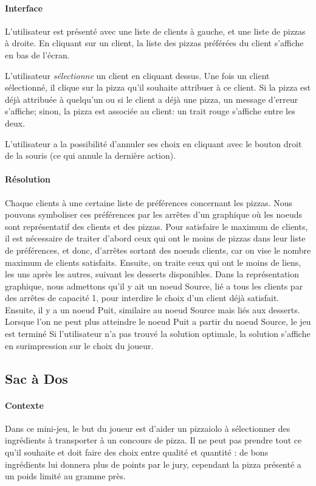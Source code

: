 		\paragraph{Interface}
			L'utilisateur est présenté avec une liste de clients à gauche, et une liste
			 de pizzas à droite. En cliquant sur un client, la liste des pizzas préférées
			 du client s'affiche en bas de l'écran.

			L'utilisateur \emph{sélectionne} un client en cliquant dessus. Une fois un client
			 sélectionné, il clique sur la pizza qu'il souhaite attribuer à ce client. Si la
			 pizza est déjà attribuée à quelqu'un ou si le client a déjà une pizza, un message
			 d'erreur s'affiche; sinon, la pizza est associée au client: un trait rouge
			 s'affiche entre les deux.

			L'utilisateur a la possibilité d'annuler ses choix en cliquant avec le bouton
			 droit de la souris (ce qui annule la dernière action).
		\paragraph{Résolution}
			Chaque clients à une certaine liste de préférences concernant les pizzas.
			Nous pouvons symboliser ces préférences par les arrêtes d'un graphique où
			 les noeuds sont représentatif des clients et des pizzas.
			Pour satisfaire le maximum de clients, il est nécessaire de traiter d'abord
			 ceux qui ont le moins de pizzas dans leur liste de préférences, et donc, 
			 d'arrêtes sortant des noeuds clients, car on vise le nombre maximum de clients
			 satisfaits.
			Ensuite, on traite ceux qui ont le moins de liens, les uns après les autres,
			 suivant les desserts disponibles.
			Dans la représentation graphique, nous admettons qu'il y ait un noeud Source,
			 lié a tous les clients par des arrêtes de capacité 1, pour interdire le 
			 choix d'un client déjà satisfait.
			Ensuite, il y a un noeud Puit, similaire au noeud Source mais liés aux 
			 desserts.
			Lorsque l'on ne peut plus atteindre le noeud Puit a partir du noeud Source,
			 le jeu est terminé
			Si l'utilisateur n'a pas trouvé la solution optimale, la solution s'affiche
			 en surimpression sur le choix du joueur.

    \subsection{Sac à Dos}
        \paragraph{Contexte}
            Dans ce mini-jeu, le but du joueur est d'aider un pizzaiolo à
            sélectionner des ingrédients à transporter à un concours de pizza.
            Il ne peut pas prendre tout ce qu'il souhaite et doit faire des
            choix entre qualité et quantité : de bons ingrédients lui donnera
            plus de points par le jury, cependant la pizza présenté a un poids
            limité au gramme près.
